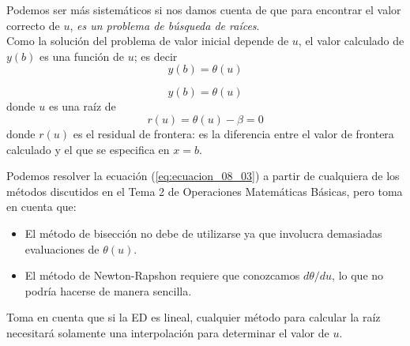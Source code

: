 \begin{frame}
Podemos ser más sistemáticos si nos damos cuenta de que para encontrar el valor correcto de $u$, \emph{es un problema de búsqueda de raíces}.
\\
\bigskip
Como la solución del problema de valor inicial depende de $u$, el valor calculado de $y(b)$ es una función de $u$; es decir
\[ y(b) = \theta(u) \]
\end{frame}
\begin{frame}
\[ y(b) = \theta(u) \]
donde $u$ es una raíz de
\begin{equation}
r(u) = \theta(u) - \beta = 0
\label{eq:ecuacion_08_03}
\end{equation}
donde $r(u)$ es el residual de frontera: es la diferencia entre el valor de frontera calculado y el que se especifica en $x=b$.
\end{frame}
\begin{frame}
Podemos resolver la ecuación (\ref{eq:ecuacion_08_03}) a partir de cualquiera de los métodos discutidos en el Tema 2 de Operaciones Matemáticas Básicas, pero toma en cuenta que:
\pause
\begin{itemize}[<+->]
\item El método de bisección no debe de utilizarse ya que involucra demasiadas evaluaciones de $\theta(u)$.
\item El método de Newton-Rapshon requiere que conozcamos $d \theta / d u$, lo que no podría hacerse de manera sencilla.
\end{itemize}
\end{frame}
\begin{frame}
Toma en cuenta que si la ED es lineal, cualquier método para calcular la raíz necesitará solamente una interpolación para determinar el valor de $u$.
\end{frame}
